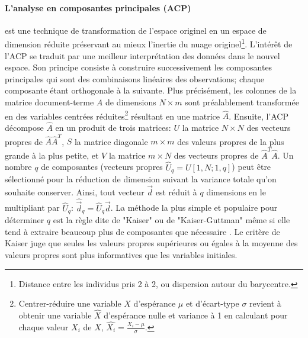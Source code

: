 \paragraph[PCA]{L'analyse en composantes principales (ACP)}
 \citep{burrows1992PCA} est une technique de transformation de l'espace originel en un espace de dimension réduite préservant au mieux l'inertie du nuage originel\footnote{Distance entre les individus pris 2 à 2, ou dispersion autour du barycentre.}. L'intérêt de l'ACP se traduit par une meilleur interprétation des données dans le nouvel espace. Son principe consiste à construire successivement les composantes principales qui sont des combinaisons linéaires des observations; chaque composante étant orthogonale à la suivante. Plus précisément, les colonnes de la matrice document-terme $A$ de dimensions $N\times m$ sont préalablement transformée en des variables centrées réduites\footnote{Centrer-réduire une variable $X$ d'espérance $\mu$ et d'écart-type $\sigma$ revient à obtenir une variable  $\hat{X}$ d'espérance nulle et variance à 1 en calculant pour chaque valeur $X_i$ de $X$, $\hat{X_i} = \frac{X_i-\mu}{\sigma}$.} résultant en une matrice $\hat{A}$. Ensuite, l'ACP décompose $\hat{A}$  en un produit de trois matrices: $U$ la matrice $N \times N$  des vecteurs propres de $\hat{A}\hat{A}^T$, $S$ la matrice diagonale $m\times m$  des valeurs propres de la plus grande à la plus petite, et $V$ la matrice $m\times N$  des vecteurs propres de $\hat{A}^T\hat{A}$. Un nombre $q$ de composantes (vecteurs propres $\hat{U}_q = U[1,N;1,q]$) peut être sélectionné pour la réduction de dimension suivant la variance totale qu'on souhaite conserver. Ainsi, tout vecteur $\vec{d}$ est réduit à $q$ dimensions en le multipliant par $\hat{U}_q$: $\hat{\vec{d}}_q = \hat{U}_q\vec{d}$.
La méthode la plus simple et populaire pour déterminer $q$ est la règle dite de  "Kaiser" ou de "Kaiser-Guttman" \citep{guttman1954factoranalysisconditions, kaiser1960computers4factoranalysis} même si elle tend à extraire beaucoup plus de composantes que nécessaire \citep{bandalos2010factoranalysismisconceptions}. Le critère de Kaiser juge que seules les valeurs propres supérieures ou égales à la moyenne des valeurs propres sont plus informatives que les variables initiales. %

